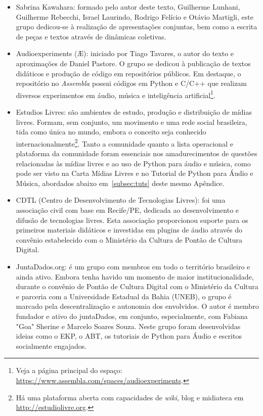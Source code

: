 \begin{itemize}
    \item Sabrina Kawahara: formado pelo autor deste texto, Guilherme Lunhani,
    Guilherme Rebecchi, Israel Laurindo, Rodrigo Felício e Otávio Martigli,
    este grupo dedicou-se à realização
    de apresentações conjuntas, bem como a escrita de peças e textos através
    de dinâmicas coletivas.
    \item Audioexperiments (Æ): iniciado por Tiago Tavares, o autor do texto e aproximações de
    Daniel Pastore. O grupo se dedicou à publicação de textos didáticos e produção
    de código em repositórios públicos. Em destaque, o repositório no \emph{Assembla}
    possui códigos em Python e C/C++ que realizam diversos experimentos em áudio, música
    e inteligência artificial\footnote{Veja a página principal do espaço: \url{https://www.assembla.com/spaces/audioexperiments}.}.
    \item Estudios Livres: são ambientes de estudo, produção e distribuição de mídias livres.
    Formam, sem conjunto, um movimento e uma rede social brasileira, tida como única no mundo, embora
    o conceito seja conhecido internacionalmente\footnote{Há uma plataforma aberta com capacidades
    de \emph{wiki}, blog e midiateca em \url{http://estudiolivre.org}.}. Tanto a comunidade quanto
    a lista operacional e plataforma da comunidade foram essenciais nos amadurecimentos de questões
    relacionadas às mídias livres e ao uso de Python para áudio e música, como pode ser visto
    na Carta Mídias Livres e no Tutorial de Python para Áudio e Música, abordados abaixo
    em~\ref{subsec:tuts} deste mesmo Apêndice.
    \item CDTL (Centro de Desenvolvimento de Tecnologias Livres): foi uma associação civil com base em Recife/PE, dedicada ao desenvolvimento e difusão de tecnologias livres. Esta associação proporcionou suporte para os primeiros materiais didáticos e investidas em plugins de áudio através do convênio estabelecido com o Ministério da Cultura de Pontão de Cultura Digital.
    \item JuntaDados.org: é um grupo com membros em todo o território brasileiro e ainda ativo. Embora tenha havido um momento de maior institucionalidade, durante o convênio de Pontão de Cultura Digital com o Ministério da Cultura e parceria com a Universidade Estadual da Bahia (UNEB), o grupo é marcado pela descentralização e autonomia dos envolvidos. O autor é membro fundador e ativo do juntaDados, em conjunto, especialmente, com Fabiana "Goa" Sherine e Marcelo Soares Souza. Neste grupo foram desenvolvidas ideias como o EKP, o ABT, os tutoriais de Python para Áudio e escritos socialmente engajados.

\end{itemize}
